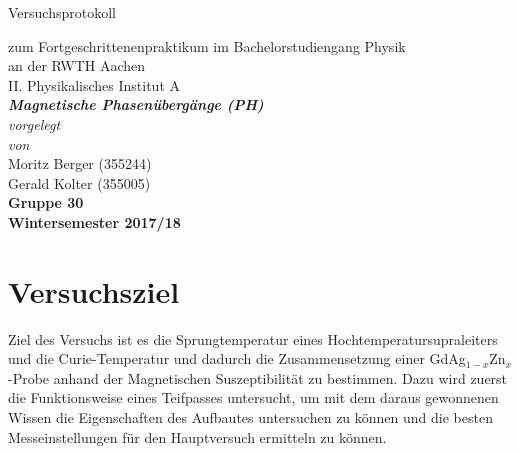 \documentclass[12pt,a4paper]{article}
\author{Gerald}
\begin{document}
	\setlength{\parindent}{0pt} 
	\begin{center}
		{\LARGE Versuchsprotokoll}\\
		\begin{large}
			zum Fortgeschrittenenpraktikum im Bachelorstudiengang Physik\\[0.4cm]
			an der RWTH Aachen\\
			II. Physikalisches Institut A\\[5.5cm]
			\Large\textbf{\textsl{Magnetische Phasenübergänge (PH)}}\\[5.5cm]
			\normalsize\textit{vorgelegt\\von}\\[0.4cm]
			\large{Moritz Berger (355244)\\Gerald Kolter (355005)}\\\textbf{Gruppe 30}\\[2cm]
			\large \textbf{Wintersemester 2017/18}
		\end{large}
	\end{center}
	\newpage
	
	\tableofcontents
	\newpage

\section{Versuchsziel}
Ziel des Versuchs ist es die Sprungtemperatur eines Hochtemperatursupraleiters und die Curie-Temperatur und dadurch die Zusammensetzung einer GdAg$_{1-x}$Zn$_x$-Probe anhand der Magnetischen Suszeptibilität zu bestimmen. Dazu wird zuerst die Funktionsweise eines Teifpasses untersucht, um mit dem daraus gewonnenen Wissen die Eigenschaften des Aufbautes untersuchen zu können und die besten Messeinstellungen für den Hauptversuch ermitteln zu können.
\end{document}
